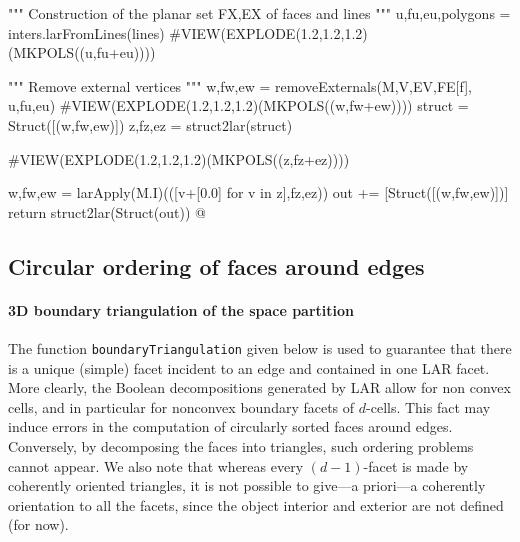 \documentclass[11pt,oneside]{article}    %
\begin{document}
{        """ Construction of the planar set FX,EX of faces and lines """
        u,fu,eu,polygons = inters.larFromLines(lines)
        #VIEW(EXPLODE(1.2,1.2,1.2)(MKPOLS((u,fu+eu))))
        
        """ Remove external vertices """
        w,fw,ew = removeExternals(M,V,EV,FE[f], u,fu,eu)
        #VIEW(EXPLODE(1.2,1.2,1.2)(MKPOLS((w,fw+ew))))
        struct = Struct([(w,fw,ew)])
        z,fz,ez = struct2lar(struct)
        
        #VIEW(EXPLODE(1.2,1.2,1.2)(MKPOLS((z,fz+ez))))
        
        w,fw,ew = larApply(M.I)(([v+[0.0] for v in z],fz,ez))
        out += [Struct([(w,fw,ew)])]
    return struct2lar(Struct(out))
@}


\subsection{Circular ordering of faces around edges}



\paragraph{3D boundary triangulation of the space partition}
The function \texttt{boundaryTriangu\-la\-tion} given below is used to guarantee that there is a unique (simple) facet incident to an edge and contained in one LAR facet. More clearly, the Boolean decompositions generated by LAR allow for non convex cells, and in particular for nonconvex boundary facets of $d$-cells. This fact may induce errors in the computation of circularly sorted faces around edges. Conversely, by decomposing the faces into triangles, such ordering problems cannot appear.  
We also note that whereas every $(d-1)$-facet is made by coherently oriented triangles, it is not possible to give---a priori---a coherently orientation to all the facets, since the object interior and exterior are not defined (for now).
\end{document}
